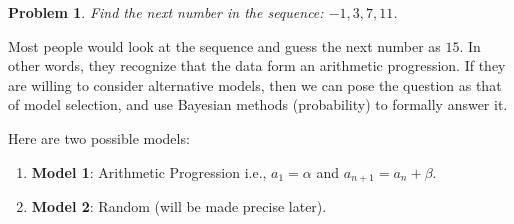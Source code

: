 \documentclass{scrartcl}
\newtheorem{problem}[theorem]{Problem}
\begin{document}
\begin{problem} 
  Find the next number in the sequence: $-1, 3, 7, 11$. 
\end{problem}

Most people would look at the sequence and guess the next number as
$15$. In other words, they recognize that the data form an arithmetic
progression. If they are willing to consider alternative models, then
we can pose the question as that of model selection, and use Bayesian
methods (probability) to formally answer it. 

Here are two possible models: 
\begin{enumerate}
\item \textbf{Model 1}: Arithmetic Progression i.e., $a_1 = \alpha$
  and $a_{n+1} = a_n + \beta$. 
\item \textbf{Model 2}: Random (will be made precise later). 
\end{enumerate}
\end{document}
